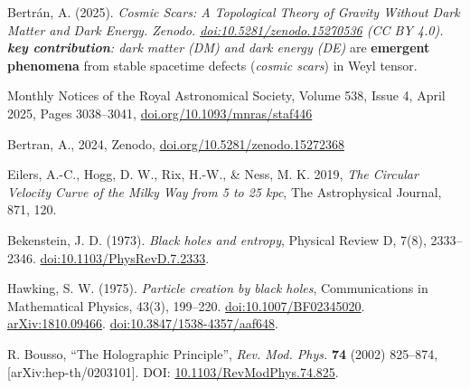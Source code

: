 \documentclass{article}
\begin{document}
\begin{thebibliography}{9}
 Bertrán, A. (2025). \emph{Cosmic Scars: A Topological Theory of Gravity Without Dark Matter and Dark Energy. 
Zenodo. \href{https://doi.org/10.5281/zenodo.15270536}{doi:10.5281/zenodo.15270536} (CC BY 4.0). \\ 
\textbf{key contribution}: dark matter (DM) and dark energy (DE)} are \textbf{emergent phenomena} from stable spacetime defects (\textit{cosmic scars}) in Weyl tensor.

 Monthly Notices of the Royal Astronomical Society, Volume 538, Issue 4, April 2025, Pages 3038–3041, \href{https://doi.org/10.1093/mnras/staf446}{doi.org/10.1093/mnras/staf446}

Bertran, A., 2024, Zenodo, 
\href{https://doi.org/10.5281/zenodo.15272368}{doi.org/10.5281/zenodo.15272368}

Eilers, A.-C., Hogg, D. W., Rix, H.-W., \& Ness, M. K. 2019, 
\emph{The Circular Velocity Curve of the Milky Way from 5 to 25 kpc}, 
The Astrophysical Journal, 871, 120. 

Bekenstein, J. D. (1973). 
\textit{Black holes and entropy}, 
Physical Review D, 7(8), 2333–2346. 
\href{https://doi.org/10.1103/PhysRevD.7.2333}{doi:10.1103/PhysRevD.7.2333}.

Hawking, S. W. (1975). 
\textit{Particle creation by black holes}, 
Communications in Mathematical Physics, 43(3), 199–220. 
\href{https://doi.org/10.1007/BF02345020}{doi:10.1007/BF02345020}.
\href{https://arxiv.org/abs/1810.09466}{arXiv:1810.09466}. 
\href{https://doi.org/10.3847/1538-4357/aaf648}{doi:10.3847/1538-4357/aaf648}.

R. Bousso, 
``The Holographic Principle'', 
\textit{Rev. Mod. Phys.} \textbf{74} (2002) 825–874, 
[arXiv:hep-th/0203101]. 
DOI: \href{https://doi.org/10.1103/RevModPhys.74.825}{10.1103/RevModPhys.74.825}.

\end{thebibliography}
\end{document}
